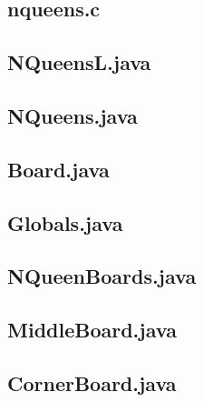 \begin{landscape}
\tiny
\subsection{nqueens.c}\label{nqueenc}

\subsection{NQueensL.java}

\subsection{NQueens.java}

\subsection{Board.java}

\subsection{Globals.java}

\subsection{NQueenBoards.java}

\subsection{MiddleBoard.java}

\subsection{CornerBoard.java}


\end{landscape}
